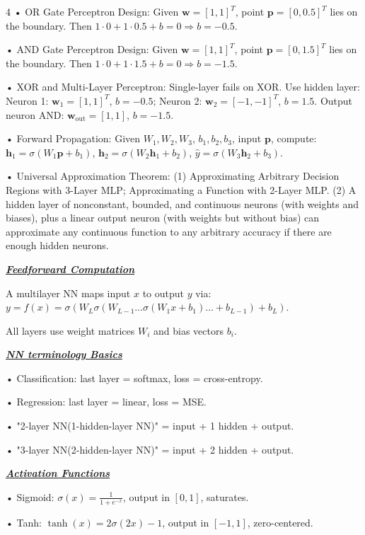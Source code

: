 \documentclass[10pt]{article}
\newcommand{\bulletPoint}[1]{\ul{\textit{\textbf{#1}}}}
\begin{document}
\begin{multicols*}{4}
• OR Gate Perceptron Design:
Given $\mathbf{w} = [1, 1]^T$, point $\mathbf{p} = [0, 0.5]^T$ lies on the boundary. \quad
Then $1 \cdot 0 + 1 \cdot 0.5 + b = 0 \Rightarrow b = -0.5$. 

• AND Gate Perceptron Design:
Given $\mathbf{w} = [1, 1]^T$, point $\mathbf{p} = [0, 1.5]^T$ lies on the boundary. \quad
Then $1 \cdot 0 + 1 \cdot 1.5 + b = 0 \Rightarrow b = -1.5$. 

• XOR and Multi-Layer Perceptron:
Single-layer fails on XOR. Use hidden layer: \quad
Neuron 1: $\mathbf{w}_1 = [1,1]^T$, $b = -0.5$; Neuron 2: $\mathbf{w}_2 = [-1,-1]^T$, $b = 1.5$. \quad
Output neuron AND: $\mathbf{w}_{\text{out}} = [1,1]$, $b = -1.5$. 

• Forward Propagation: 
Given $W_1, W_2, W_3$, $b_1, b_2, b_3$, input $\mathbf{p}$, compute: \quad
$\mathbf{h}_1 = \sigma(W_1 \mathbf{p} + b_1)$, $\mathbf{h}_2 = \sigma(W_2 \mathbf{h}_1 + b_2)$, $\hat{y} = \sigma(W_3 \mathbf{h}_2 + b_3)$.

• Universal Approximation Theorem:
(1) Approximating Arbitrary Decision Regions with 3-Layer MLP; Approximating a Function with 2-Layer MLP.
(2) A hidden layer of nonconstant, bounded, and continuous neurons (with weights
and biases), plus a linear output neuron (with weights but without bias) can
approximate any continuous function to any arbitrary accuracy if there are
enough hidden neurons. 

\bulletPoint{Feedforward Computation} \quad

A multilayer NN maps input $x$ to output $y$ via: 
$y = f(x) = \sigma(W_L \sigma(W_{L-1} \dots \sigma(W_1 x + b_1) \dots + b_{L-1}) + b_L)$. \quad

All layers use weight matrices $W_i$ and bias vectors $b_i$. 

\bulletPoint{NN terminology Basics} \quad

• Classification: last layer = softmax, loss = cross-entropy. \quad

• Regression: last layer = linear, loss = MSE. \quad

• "2-layer NN(1-hidden-layer NN)" = input + 1 hidden + output. \quad

• "3-layer NN(2-hidden-layer NN)" = input + 2 hidden + output.

\bulletPoint{Activation Functions} \quad

• Sigmoid: $\sigma(x) = \frac{1}{1 + e^{-x}}$, output in $[0,1]$, saturates. \quad

• Tanh: $\tanh(x)=2\sigma(2x)-1$, output in $[-1,1]$, zero-centered. \quad


\end{multicols*}
\end{document}
